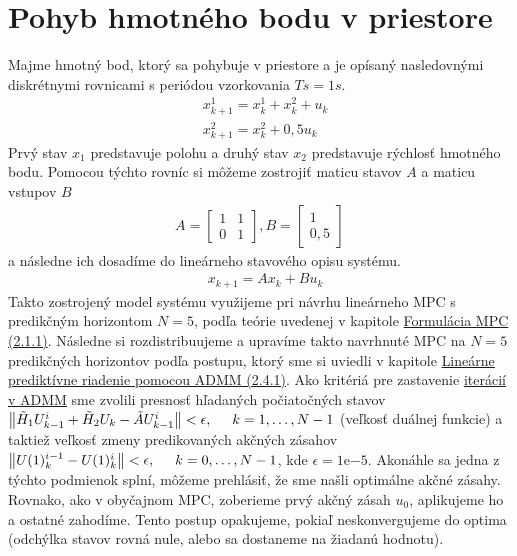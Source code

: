 \section{Pohyb hmotného bodu v priestore}
\label{sec:HB}
Majme hmotný bod, ktorý sa pohybuje v priestore a je opísaný nasledovnými diskrétnymi rovnicami s periódou vzorkovania $Ts = 1s$.
\label{math:model_HB}
\begin{align}
&x_{k+1}^{1} = x_{k}^{1} + x_{k}^{2} + u_{k}\\
&x_{k+1}^{2} = x_{k}^{2} + 0,5u_{k}
\end{align}
Prvý stav $x_{1}$ predstavuje polohu a druhý stav $x_{2}$ predstavuje rýchlosť hmotného bodu. Pomocou týchto rovníc si môžeme zostrojiť maticu stavov $A$ a maticu vstupov $B$
\begin{align}
A = \begin{bmatrix}
1 &1\\
0 &1
\end{bmatrix},
B= \begin{bmatrix}
1\\
0,5
\end{bmatrix}
\end{align}
a následne ich dosadíme do lineárneho stavového opisu systému.
\begin{align}
& x_{k+1} = Ax_{k}+Bu_{k}
\end{align}
Takto zostrojený model systému využijeme pri návrhu lineárneho MPC s predikčným horizontom $N = 5$, podľa teórie uvedenej v kapitole \hyperref[subse:MPC]{Formulácia MPC (2.1.1)}. Následne si rozdistribuujeme a upravíme takto navrhnuté MPC na $N = 5$ predikčných horizontov podľa postupu, ktorý sme si uviedli v kapitole \hyperref[subse:Lin_MPC_ADMM]{Lineárne prediktívne riadenie pomocou ADMM (2.4.1)}. Ako kritériá pre zastavenie \hyperref[subse:ADMM2]{iterácií v ADMM} sme zvolili presnosť hľadaných počiatočných stavov $\left\lVert\tilde{H}_{1}U_{k-1}^{i} + \tilde{H}_{2}U_{k} - \tilde{A}U_{k-1}^{i}\right\rVert < \epsilon,\hspace{0.5cm} k=1,\dots,N-1$ (veľkosť duálnej funkcie) a taktiež veľkosť zmeny predikovaných akčných zásahov $\left\lVert U(1)_{k}^{i-1}-U(1)_{k}^{i}\right\rVert < \epsilon,\hspace{0.5cm} k=0,\dots,N-1$, kde $\epsilon = 1\mathrm{e}{-5}$. Akonáhle sa jedna z týchto podmienok splní, môžeme prehlásiť, že sme našli optimálne akčné zásahy. Rovnako, ako v obyčajnom MPC, zoberieme prvý akčný zásah $u_{0}$, aplikujeme ho a ostatné zahodíme. Tento postup opakujeme, pokiaľ neskonvergujeme do optima (odchýlka stavov rovná nule, alebo sa dostaneme na žiadanú hodnotu).

